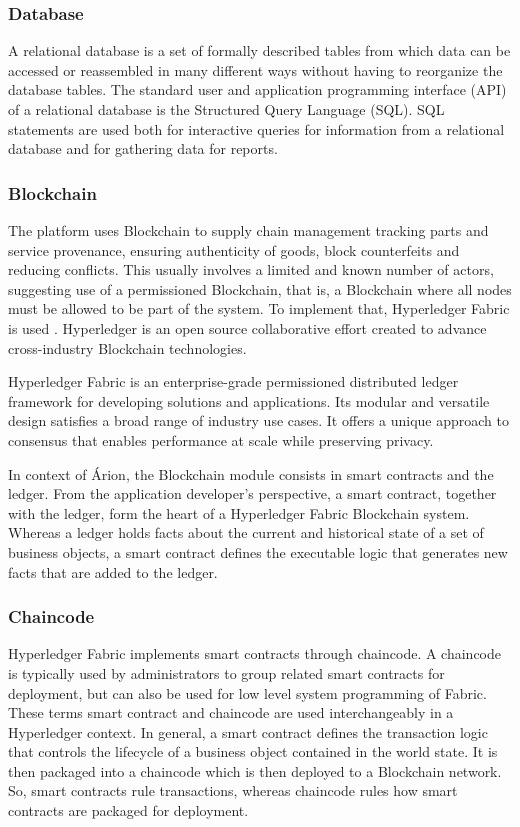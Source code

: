 \subsubsection{Database}\label{sec:Database}
A relational database is a set of formally described tables from which data can be accessed or reassembled in many different ways without having to reorganize the database tables. The standard user and application programming interface (API) of a relational database is the Structured Query Language (SQL). SQL statements are used both for interactive queries for information from a relational database and for gathering data for reports.

\subsubsection{Blockchain}\label{sec:DataStorageBlockchain}
The platform uses Blockchain to supply chain management tracking parts and service provenance, ensuring authenticity of goods, block counterfeits and reducing conflicts. This usually involves a limited and known number of actors, suggesting use of a permissioned Blockchain, that is, a Blockchain where all nodes must be allowed to be part of the system. To implement that, Hyperledger Fabric is used \cite{cachin2016architecture}. Hyperledger is an open source collaborative effort created to advance cross-industry Blockchain technologies. 

Hyperledger Fabric is an enterprise-grade permissioned distributed ledger framework for developing solutions and applications. Its modular and versatile design satisfies a broad range of industry use cases. It offers a unique approach to consensus that enables performance at scale while preserving privacy.

In context of Árion, the Blockchain module consists in smart contracts and the ledger. From the application developer’s perspective, a smart contract, together with the ledger, form the heart of a Hyperledger Fabric Blockchain system. Whereas a ledger holds facts about the current and historical state of a set of business objects, a smart contract defines the executable logic that generates new facts that are added to the ledger. 

\subsubsection{Chaincode}
Hyperledger Fabric implements smart contracts through chaincode. A chaincode is typically used by administrators to group related smart contracts for deployment, but can also be used for low level system programming of Fabric. These terms smart contract and chaincode are used interchangeably in a Hyperledger context. In general, a smart contract defines the transaction logic that controls the lifecycle of a business object contained in the world state. It is then packaged into a chaincode which is then deployed to a Blockchain network. So, smart contracts rule transactions, whereas chaincode rules how smart contracts are packaged for deployment.

